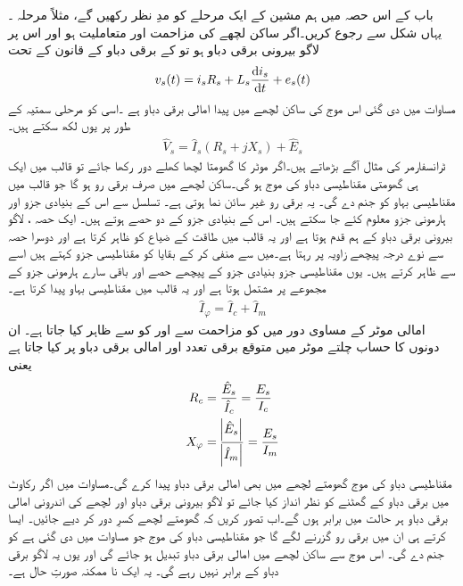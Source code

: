 باب کے اس حصہ میں ہم مشین کے ایک مرحلے کو مدِ نظر رکھیں گے، مثلاً مرحلہ  ۔ یہاں شکل   سے رجوع کریں۔اگر ساکن لچھے کی مزاحمت  اور متعاملیت  ہو اور اس پر لاگو بیرونی برقی دباو  ہو تو  کے برقی دباو کے قانون کے تحت
\begin{align}
v_s(t)=i_s R_s +L_s \frac{\dif i_s}{\dif t}+e_s(t)
\end{align}
 مساوات   میں دی گئی اس موج کی ساکن لچھے میں پیدا امالی برقی دباو ہے ۔اسی کو مرحلی سمتیہ کے طور پر یوں لکھ سکتے ہیں۔
\begin{align}\label{مساوات_امالی_دوری_موٹر_مساوات}
\hat{V}_s=\hat{I}_s \left(R_s+j X_s \right)+\hat{E}_s
\end{align}
ٹرانسفارمر کی مثال آگے بڑھاتے ہیں۔اگر موٹر کا گھومتا لچھا کھلے دور رکھا جائے تو قالب میں ایک ہی گھومتی مقناطیسی دباو کی موج  ہو گی۔ساکن لچھے میں صرف برقی رو  ہو گا جو قالب میں مقناطیسی بہاو  کو جنم دے گی۔ یہ برقی رو  غیر سائن نما ہوتی ہے۔  تسلسل سے اس کے بنیادی جزو اور ہارمونی جزو معلوم کئے جا سکتے ہیں۔ اس کے بنیادی جزو کے دو حصے ہوتے ہیں۔ ایک حصہ  ، لاگو بیرونی برقی دباو  کے ہم قدم ہوتا ہے اور یہ قالب میں طاقت کے ضیاع کو ظاہر کرتا ہے اور دوسرا حصہ  سے نوے درجہ پیچھے زاویہ پر رہتا ہے۔میں سے  منفی کر کے بقایا کو مقناطیسی جزو کہتے ہیں اسے  سے ظاہر کرتے ہیں۔ یوں مقناطیسی جزو بنیادی جزو کے پیچھے حصے اور باقی سارے ہارمونی جزو کے مجموعے پر مشتمل ہوتا ہے اور یہ قالب میں مقناطیسی بہاو  پیدا کرتا ہے۔
\begin{align}
\hat{I}_\varphi=\hat{I}_c+\hat{I}_m
\end{align}
 امالی موٹر کے مساوی دور میں  کو مزاحمت  سے اور  کو  سے ظاہر کیا جاتا ہے۔ ان دونوں کا حساب چلتے موٹر میں متوقع برقی تعدد  اور امالی برقی دباو  پر کیا جاتا ہے یعنی
\begin{gather}
\begin{aligned}
R_c&=\frac{\hat{E}_s}{\hat{I}_c}=\frac{E_s}{I_c}\\
X_\varphi&=\frac{\abs{\hat{E}_s}}{\abs{\hat{I}_m}}=\frac{E_s}{I_m}
\end{aligned}
\end{gather}
مقناطیسی دباو کی موج  گھومتے لچھے میں بھی امالی برقی دباو پیدا کرے گی۔مساوات   میں اگر رکاوٹ میں برقی دباو کے گھٹنے کو نظر انداز کیا جائے تو لاگو بیرونی برقی دباو اور لچھے کی اندرونی امالی برقی دباو ہر حالت میں برابر ہوں گے۔اب تصور کریں کہ گھومتے لچھے کسرِ دور کر دیے جائیں۔ ایسا کرتے ہی ان میں برقی رو گزرنے لگے گا جو مقناطیسی دباو کی موج   جو مساوات   میں دی گئی ہے کو جنم دے گی۔ اس موج سے ساکن لچھے میں امالی برقی دباو  تبدیل ہو جائے گی اور یوں یہ لاگو برقی دباو کے برابر نہیں رہے گی۔ یہ ایک نا ممکنہ صورتِ حال ہے۔

